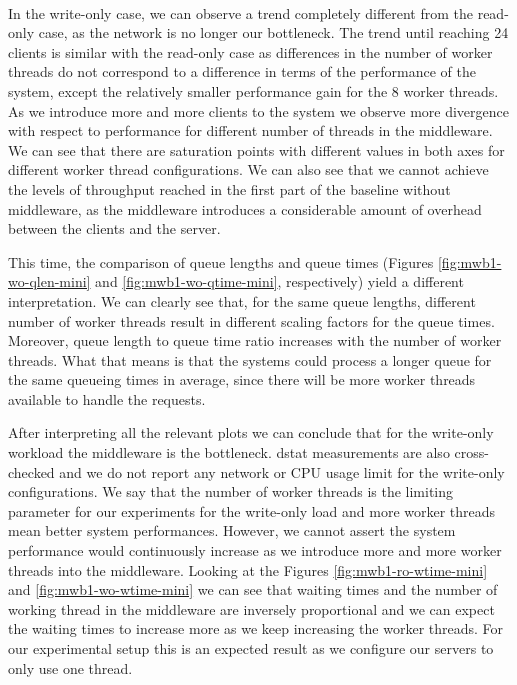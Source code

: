 \documentclass[11pt,a4paper]{article}
\begin{document}
\\
\par In the write-only case, we can observe a trend completely different from the read-only case, as the network is no longer our bottleneck. The trend until reaching 24 clients is similar with the read-only case as differences in the number of worker threads do not correspond to a difference in terms of the performance of the system, except the relatively smaller performance gain for the 8 worker threads. As we introduce more and more clients to the system we observe more divergence with respect to performance for different number of threads in the middleware. We can see that there are saturation points with different values in both axes for different worker thread configurations. We can also see that we cannot achieve the levels of throughput reached in the first part of the baseline without middleware, as the middleware introduces a considerable amount of overhead between the clients and the server.
\par This time, the comparison of queue lengths and queue times (Figures \ref{fig:mwb1-wo-qlen-mini} and \ref{fig:mwb1-wo-qtime-mini}, respectively) yield a different interpretation. We can clearly see that, for the same queue lengths, different number of worker threads result in different scaling factors for the queue times. Moreover, queue length to queue time ratio increases with the number of worker threads. What that means is that the systems could process a longer queue for the same queueing times in average, since there will be more worker threads available to handle the requests.
\par After interpreting all the relevant plots we can conclude that for the write-only workload the middleware is the bottleneck. dstat measurements are also cross-checked and we do not report any network or CPU usage limit for the write-only configurations. We say that the number of worker threads is the limiting parameter for our experiments for the write-only load and more worker threads mean better system performances. However, we cannot assert the system performance would continuously increase as we introduce more and more worker threads into the middleware. Looking at the Figures \ref{fig:mwb1-ro-wtime-mini} and \ref{fig:mwb1-wo-wtime-mini} we can see that waiting times and the number of working thread in the middleware are inversely proportional and we can expect the waiting times to increase more as we keep increasing the worker threads. For our experimental setup this is an expected result as we configure our servers to only use one thread. 
\end{document}
